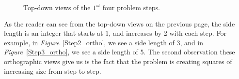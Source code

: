 \documentclass[11pt]{article}
\begin{document}
		\begin{figure}[h]
			\begin{center}
			\end{center}
			\begin{center}
			\end{center}
			\caption{Top-down views of the $1^{st}$ four problem steps.}
			\label{fig:disks_ortho}
		\end{figure}

	\newpage

	As the reader can see from the top-down views on the previous page, the side length is an integer that starts at 1, and increases by 2 with each step.  
	For example, in \emph{Figure}~\ref{Step2_ortho}, we see a side length of 3, and in \emph{Figure}~\ref{Step3_ortho}, we see a side length of 5.  The second observation these
	orthographic views give us is the fact that the problem is creating squares of increasing size from step to step.\\
	
\end{document}
